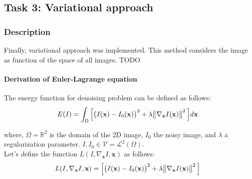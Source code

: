 \documentclass[paper=a4, fontsize=11pt]{scrartcl} %
\numberwithin{equation}{section} %
\numberwithin{figure}{section} %
\numberwithin{table}{section} %
\renewcommand{\vec}[1]{\mathbf{#1}}
\begin{document}

\subsection{Task 3: Variational approach}

\subsubsection{Description}

Finally, variational approach was implemented. This method considers the image as function of the space of all images. 
TODO

\paragraph{Derivation of Euler-Lagrange equation}

The energy function for denoising problem can be defined as follows:
\begin{align}
	E(I) = \int_{\Omega}\Big[\big(I(\vec{x}) - I_0(\vec{x})\big)^2 + \lambda \norm{\nabla_{\vec{x}} I(\vec{x})}^2 \Big]	d\vec{x}
\end{align}

where, $\Omega = \mathbb{R}^2$ is the domain of the 2D image, $I_0$ the noisy image, and $\lambda$ a regularization parameter. $I, I_0 \in \mathcal{V} = \mathcal{L}^2(\Omega)$. \\

Let's define the function $L(I, \nabla_{\vec{x}} I, \vec{x})$ as follows: 
\begin{align}
	L(I, \nabla_{\vec{x}} I, \vec{x}) = \Big[\big(I(\vec{x}) - I_0(\vec{x})\big)^2 + \lambda \norm{\nabla_{\vec{x}} I(\vec{x})}^2 \Big]
\end{align}
\end{document}

